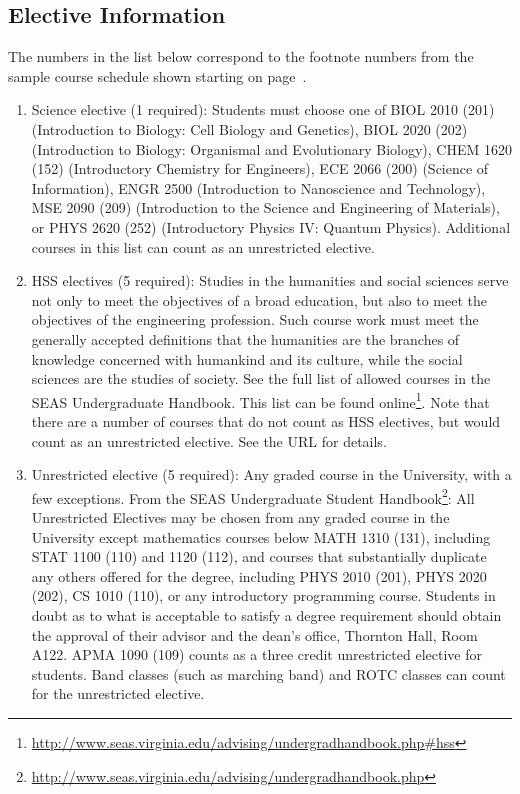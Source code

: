\documentclass[10pt,letter]{book}
\newcommand{\myurl}[1]{\footnote{\scriptsize\url{#1}}}
\begin{document}
\subsection{Elective Information}
\label{sec:electiveinfo}

The numbers in the list below correspond to the footnote numbers from
the sample course schedule shown starting on
page~\pageref{sec:bscsschedule}.

\begin{enumerate}

\item Science elective (1 required): Students must choose one of BIOL
  2010 (201) (Introduction to Biology: Cell Biology and Genetics),
  BIOL 2020 (202) (Introduction to Biology: Organismal and
  Evolutionary Biology), CHEM 1620 (152) (Introductory Chemistry for
  Engineers), ECE 2066 (200) (Science of Information), ENGR 2500
  (Introduction to Nano\-science and Technology), MSE 2090 (209)
  (Introduction to the Science and Engineering of Materials), or PHYS
  2620 (252) (Introductory Physics IV: Quantum Physics). Additional
  courses in this list can count as an unrestricted elective.

\item HSS electives (5 required): Studies in the humanities and social
  sciences serve not only to meet the objectives of a broad education,
  but also to meet the objectives of the engineering profession. Such
  course work must meet the generally accepted definitions that the
  humanities are the branches of knowledge concerned with humankind
  and its culture, while the social sciences are the studies of
  society. See the full list of allowed courses in the SEAS
  Undergraduate Handbook. This list can be found
  online\myurl{http://www.seas.virginia.edu/advising/undergradhandbook.php\#hss}. Note
  that there are a number of courses that do not count as HSS
  electives, but would count as an unrestricted elective. See the URL
  for details.

\item Unrestricted elective (5 required): Any graded course in the
  University, with a few exceptions. From the SEAS Undergraduate
  Student Handbook\myurl{http://www.seas.virginia.edu/advising/undergradhandbook.php}:
  All Unrestricted Electives may be chosen from any graded course in
  the University except mathematics courses below MATH 1310 (131),
  including STAT 1100 (110) and 1120 (112), and courses that
  substantially duplicate any others offered for the degree, including
  PHYS 2010 (201), PHYS 2020 (202), CS 1010 (110), or any introductory
  programming course. Students in doubt as to what is acceptable to
  satisfy a degree requirement should obtain the approval of their
  advisor and the dean's office, Thornton Hall, Room A122. APMA 1090
  (109) counts as a three credit unrestricted elective for
  students. Band classes (such as marching band) and ROTC classes can
  count for the unrestricted elective.


\end{enumerate}
\end{document}
